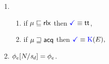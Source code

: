 \begin{minipage}{1.0\linewidth}
\begin{minipage}[t]{.55\textwidth}
\begin{enumerate}[resume,topsep=0pt,label=(\textsc{r}\arabic*),ref=\textsc{r}\arabic*]
    \item[] 
      \begin{enumerate}[leftmargin=0pt]
      \item \label{read-term-nonempty-ca-addr}
        if $\mu\sqsubseteq{\mathsf{rlx}}$ then $\aTerm \riff \TRUE$,
      \item \label{read-term-empty-ca-addr}
        if $\mu\sqsupseteq{\mathsf{acq}}$ then
        \begin{math}
          \aTerm \riff
          \kappaE{}, %
        \end{math}
      \end{enumerate}      
    \item \label{read-phi-ca-addr}
      $\phi_e[N/\mathit{s}_{d}]=\phi_e$.
    \end{enumerate}
  \end{minipage}
\end{minipage}
